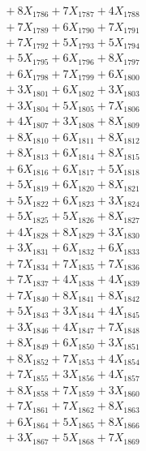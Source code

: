 \documentclass[a4paper,10pt]{article}
\begin{document}
{\begin{align}
&\;  + 8 X_{1786} + 7 X_{1787} + 4 X_{1788} \\[0.3ex]
&\;  + 7 X_{1789} + 6 X_{1790} + 7 X_{1791} \\[0.3ex]
&\;  + 7 X_{1792} + 5 X_{1793} + 5 X_{1794} \\[0.3ex]
&\;  + 5 X_{1795} + 6 X_{1796} + 8 X_{1797} \\[0.3ex]
&\;  + 6 X_{1798} + 7 X_{1799} + 6 X_{1800} \\[0.3ex]
&\;  + 3 X_{1801} + 6 X_{1802} + 3 X_{1803} \\[0.3ex]
&\;  + 3 X_{1804} + 5 X_{1805} + 7 X_{1806} \\[0.3ex]
&\;  + 4 X_{1807} + 3 X_{1808} + 8 X_{1809} \\[0.5ex]\allowbreak
&\;  + 8 X_{1810} + 6 X_{1811} + 8 X_{1812} \\[0.3ex]
&\;  + 8 X_{1813} + 6 X_{1814} + 8 X_{1815} \\[0.3ex]
&\;  + 6 X_{1816} + 6 X_{1817} + 5 X_{1818} \\[0.3ex]
&\;  + 5 X_{1819} + 6 X_{1820} + 8 X_{1821} \\[0.3ex]
&\;  + 5 X_{1822} + 6 X_{1823} + 3 X_{1824} \\[0.3ex]
&\;  + 5 X_{1825} + 5 X_{1826} + 8 X_{1827} \\[0.3ex]
&\;  + 4 X_{1828} + 8 X_{1829} + 3 X_{1830} \\[0.3ex]
&\;  + 3 X_{1831} + 6 X_{1832} + 6 X_{1833} \\[0.3ex]
&\;  + 7 X_{1834} + 7 X_{1835} + 7 X_{1836} \\[0.3ex]
&\;  + 7 X_{1837} + 4 X_{1838} + 4 X_{1839} \\[0.5ex]\allowbreak
&\;  + 7 X_{1840} + 8 X_{1841} + 8 X_{1842} \\[0.3ex]
&\;  + 5 X_{1843} + 3 X_{1844} + 4 X_{1845} \\[0.3ex]
&\;  + 3 X_{1846} + 4 X_{1847} + 7 X_{1848} \\[0.3ex]
&\;  + 8 X_{1849} + 6 X_{1850} + 3 X_{1851} \\[0.3ex]
&\;  + 8 X_{1852} + 7 X_{1853} + 4 X_{1854} \\[0.3ex]
&\;  + 7 X_{1855} + 3 X_{1856} + 4 X_{1857} \\[0.3ex]
&\;  + 8 X_{1858} + 7 X_{1859} + 3 X_{1860} \\[0.3ex]
&\;  + 7 X_{1861} + 7 X_{1862} + 8 X_{1863} \\[0.3ex]
&\;  + 6 X_{1864} + 5 X_{1865} + 8 X_{1866} \\[0.3ex]
&\;  + 3 X_{1867} + 5 X_{1868} + 7 X_{1869} \\[0.5ex]\allowbreak

\end{align}}
\end{document}
